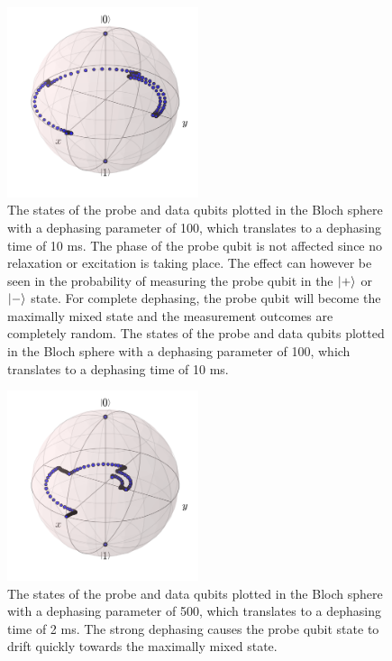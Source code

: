 \begin{figure}[h]
  \centering
    \includegraphics[width=0.5\textwidth]{../Figures/Circ_orbit_odd_100_dephasing.png}
      \caption{The states of the probe and data qubits plotted in the Bloch sphere with a dephasing parameter of 100, which translates to a dephasing time of 10 ms. The phase of the probe qubit is not affected since no relaxation or excitation is taking place. The effect can however be seen in the probability of measuring the probe qubit in the $\ket{+}$ or $\ket{-}$ state. For complete dephasing, the probe qubit will become the maximally mixed state and the measurement outcomes are completely random. The states of the probe and data qubits plotted in the Bloch sphere with a dephasing parameter of 100, which translates to a dephasing time of 10 ms.}
      \label{fig:BlochsphereDephasing}
      
\end{figure}


\begin{figure}[!h]
  \centering
    \includegraphics[width=0.5\textwidth]{../Figures/Circ_orbit_odd_500_dephasing.png}
      \caption{The states of the probe and data qubits plotted in the Bloch sphere with a dephasing parameter of 500, which translates to a dephasing time of 2 ms. The strong dephasing causes the probe qubit state to drift quickly towards the maximally mixed state. }
      \label{fig:BlochsphereDephasing2}
\end{figure}

